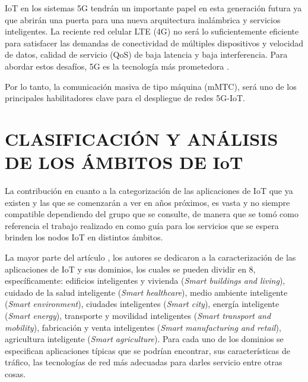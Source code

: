 IoT en los sistemas 5G tendrán un importante papel en esta generación futura ya que abrirán una puerta para una nueva arquitectura inalámbrica y servicios inteligentes. La reciente red celular LTE (4G) no será lo suficientemente eficiente para satisfacer las demandas de conectividad de múltiples dispositivos y velocidad de datos, calidad de servicio (QoS) de baja latencia y baja interferencia. Para abordar estos desafíos, 5G es la tecnología más prometedora \parencite{Chetri2020}. \newline

Por lo tanto, la comunicación masiva de tipo máquina (mMTC), será uno de los principales habilitadores clave para el despliegue de redes 5G-IoT.


\section{CLASIFICACIÓN Y ANÁLISIS DE LOS ÁMBITOS DE IoT}

La contribución en cuanto a la categorización de las aplicaciones de IoT que ya existen y las que se comenzarán a ver en años próximos, es vasta y no siempre compatible dependiendo del grupo que se consulte, de manera que se tomó como referencia el trabajo realizado en \parencite{NetTrafficIoT} como guía para los servicios que se espera brinden los nodos IoT en distintos ámbitos.\newline

La mayor parte del artículo \parencite{NetTrafficIoT}, los autores se dedicaron a la caracterización de las aplicaciones de IoT y sus dominios, los cuales se pueden dividir en 8, específicamente: edificios inteligentes y vivienda (\textit{Smart buildings and living}), cuidado de la salud inteligente (\textit{Smart healthcare}), medio ambiente inteligente (\textit{Smart environment}), ciudades inteligentes (\textit{Smart city}), energía inteligente (\textit{Smart energy}), transporte y movilidad  inteligentes (\textit{Smart transport and mobility}), fabricación y venta inteligentes (\textit{Smart manufacturing and retail}), agricultura inteligente (\textit{Smart agriculture}). Para cada uno de los dominios se especifican aplicaciones típicas que se podrían encontrar, sus características de tráfico, las tecnologías de red más adecuadas para darles servicio entre otras cosas.\newline

